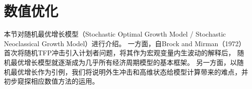 
\section{数值优化}    \label{sec-numerica-optimization}

本节对随机最优增长模型（Stochastic Optimal Growth Model / Stochastic Neoclassical Growth Model）进行介绍。
一方面，自Brock and Mirman（1972）首次将随机TFP冲击引入计划者问题，将其作为宏观变量内生波动的解释后，
随机最优增长模型就逐渐成为几乎所有经济周期模型的基本框架。
另一方面，以随机最优增长作为引例，我们将说明外生冲击和高维状态给模型计算带来的难点，并初步窥探相应数值方法的运用。


